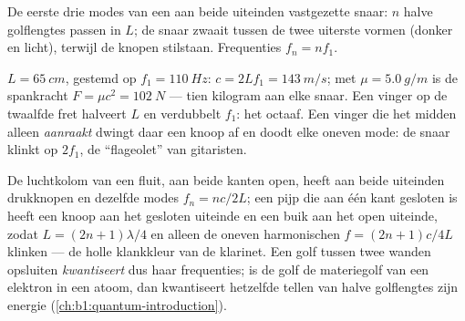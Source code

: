 \begin{omfigure}

{\small De eerste drie modes van een aan beide uiteinden vastgezette snaar: $n$
halve golflengtes passen in $L$; de snaar zwaait tussen de twee uiterste
vormen (donker en licht), terwijl de knopen stilstaan. Frequenties $f_n = nf_1$.}
\end{omfigure}

\begin{example}\label{ex:b1:wave-propagation:guitar}
$L = \qty{65}{cm}$, gestemd op $f_1 = \qty{110}{Hz}$: $c = 2Lf_1 =
\qty{143}{m/s}$; met $\mu = \qty{5.0}{g/m}$ is de spankracht $F = \mu c^2
= \qty{102}{N}$ --- tien kilogram aan elke snaar. Een vinger op de
twaalfde fret halveert $L$ en verdubbelt $f_1$: het octaaf.
Een vinger die het midden alleen \emph{aanraakt} dwingt daar een knoop af
en doodt elke oneven mode: de snaar klinkt op $2f_1$, de ``flageolet'' van
gitaristen.
\end{example}

\begin{remark}\label{rem:b1:wave-propagation:pipes}
De luchtkolom van een fluit, aan beide kanten open, heeft aan beide uiteinden
drukknopen en dezelfde modes $f_n = nc/2L$; een pijp die aan één kant gesloten
is heeft een knoop aan het gesloten uiteinde en een buik aan het open uiteinde,
zodat $L = (2n + 1)\lambda/4$ en alleen de oneven harmonischen $f = (2n + 1)c/4L$
klinken --- de holle klankkleur van de klarinet. Een golf tussen twee wanden
opsluiten \emph{kwantiseert} dus haar frequenties; is de golf de materiegolf
van een elektron in een atoom, dan kwantiseert hetzelfde tellen van halve
golflengtes zijn energie (\cref{ch:b1:quantum-introduction}).
\end{remark}

